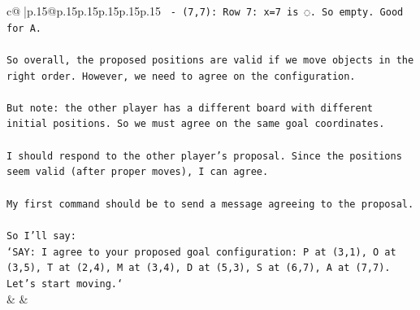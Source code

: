 \documentclass{article}
\begin{document}
{\begin{supertabular}{c@{$\;$}|p{.15\linewidth}@{}p{.15\linewidth}p{.15\linewidth}p{.15\linewidth}p{.15\linewidth}p{.15\linewidth}}
{{{\texttt{   {-} (7,7): Row 7: x=7 is ◌. So empty. Good for A.} \\
\\ 
\texttt{So overall, the proposed positions are valid if we move objects in the right order. However, we need to agree on the configuration.} \\
\\ 
\texttt{But note: the other player has a different board with different initial positions. So we must agree on the same goal coordinates.} \\
\\ 
\texttt{I should respond to the other player's proposal. Since the positions seem valid (after proper moves), I can agree.} \\
\\ 
\texttt{My first command should be to send a message agreeing to the proposal.} \\
\\ 
\texttt{So I'll say:} \\
\texttt{`SAY: I agree to your proposed goal configuration: P at (3,1), O at (3,5), T at (2,4), M at (3,4), D at (5,3), S at (6,7), A at (7,7). Let's start moving.`} \\
            }
        }
    }
    & & \\ \\


\end{supertabular}}
\end{document}
